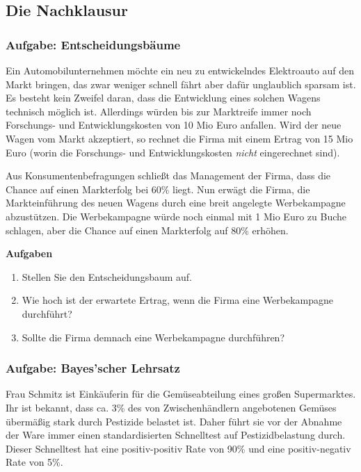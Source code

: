 
\subsection{Die Nachklausur}

\subsubsection{Aufgabe: Entscheidungsbäume}

Ein Automobilunternehmen möchte ein neu zu entwickelndes Elektroauto auf den
Markt bringen, das zwar weniger schnell fährt aber dafür unglaublich sparsam
ist. Es besteht kein Zweifel daran, dass die Entwicklung eines solchen Wagens
technisch möglich ist. Allerdings würden bis zur Marktreife immer noch
Forschungs- und Entwicklungskosten von 10 Mio Euro anfallen. Wird der neue
Wagen vom Markt akzeptiert, so rechnet die Firma mit einem Ertrag von 15
Mio Euro (worin die Forschungs- und Entwicklungskosten {\em nicht} eingerechnet sind).

Aus Konsumentenbefragungen schließt das Management der Firma, dass die Chance
auf einen Markterfolg bei 60\% liegt. Nun erwägt die Firma, die Markteinführung
des neuen Wagens durch eine breit angelegte Werbekampagne abzustützen. Die
Werbekampagne würde noch einmal mit 1 Mio Euro zu Buche schlagen, aber die
Chance auf einen Markterfolg auf 80\% erhöhen.

\vspace{0.5cm}

{\bf Aufgaben}
\begin{enumerate}
  \item Stellen Sie den Entscheidungsbaum auf.
  \item Wie hoch ist der erwartete Ertrag, wenn die Firma eine Werbekampagne
  durchführt? 
  \item Sollte die Firma demnach eine Werbekampagne durchführen?
\end{enumerate}

\vspace{1cm}

\subsubsection{Aufgabe: Bayes'scher Lehrsatz}

Frau Schmitz ist Einkäuferin für die Gemüseabteilung eines großen
Supermarktes. Ihr ist bekannt, dass ca. 3\% des von Zwischenhändlern
angebotenen Gemüses übermäßig stark durch Pestizide belastet ist. Daher führt
sie vor der Abnahme der Ware immer einen standardisierten Schnelltest
auf Pestizidbelastung durch. Dieser Schnelltest hat eine positiv-positiv Rate
von 90\% und eine positiv-negativ Rate von 5\%. 

